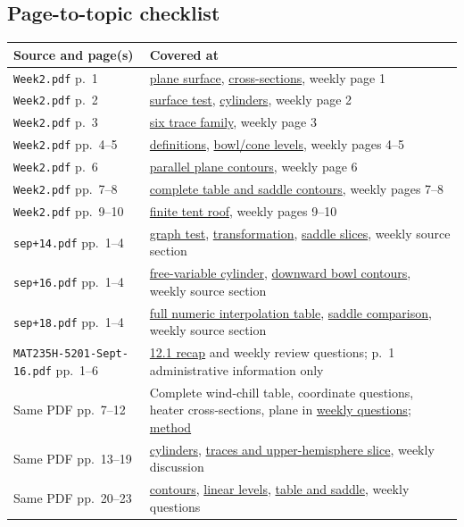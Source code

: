 \subsection{Page-to-topic checklist}
\small
\begin{longtable}{p{.40\linewidth}p{.50\linewidth}}
\toprule Source and page(s) & Covered at\\\midrule\endhead
\texttt{Week2.pdf} p.~1 & \hyperref[surface]{plane surface}, \hyperref[cross]{cross-sections}, weekly page 1\\
\texttt{Week2.pdf} p.~2 & \hyperref[surface]{surface test}, \hyperref[cylinder]{cylinders}, weekly page 2\\
\texttt{Week2.pdf} p.~3 & \hyperref[cross]{six trace family}, weekly page 3\\
\texttt{Week2.pdf} pp.~4--5 & \hyperref[contour]{definitions}, \hyperref[radial]{bowl/cone levels}, weekly pages 4--5\\
\texttt{Week2.pdf} p.~6 & \hyperref[plane]{parallel plane contours}, weekly page 6\\
\texttt{Week2.pdf} pp.~7--8 & \hyperref[saddle]{complete table and saddle contours}, weekly pages 7--8\\
\texttt{Week2.pdf} pp.~9--10 & \hyperref[tent]{finite tent roof}, weekly pages 9--10\\
\texttt{sep+14.pdf} pp.~1--4 & \hyperref[graph]{graph test}, \hyperref[transform]{transformation}, \hyperref[cross]{saddle slices}, weekly source section\\
\texttt{sep+16.pdf} pp.~1--4 & \hyperref[cylinder]{free-variable cylinder}, \hyperref[radial]{downward bowl contours}, weekly source section\\
\texttt{sep+18.pdf} pp.~1--4 & \hyperref[table]{full numeric interpolation table}, \hyperref[saddle]{saddle comparison}, weekly source section\\
\texttt{MAT235H-5201-Sept-16.pdf} pp.~1--6 & \hyperref[supplement]{12.1 recap} and weekly review questions; p.~1 administrative information only\\
Same PDF pp.~7--12 & Complete wind-chill table, coordinate questions, heater cross-sections, plane in \hyperref[weekly]{weekly questions}; \hyperref[cross]{method}\\
Same PDF pp.~13--19 & \hyperref[cylinder]{cylinders}, \hyperref[cross]{traces and upper-hemisphere slice}, weekly discussion\\
Same PDF pp.~20--23 & \hyperref[radial]{contours}, \hyperref[plane]{linear levels}, \hyperref[saddle]{table and saddle}, weekly questions\\

\end{longtable}
